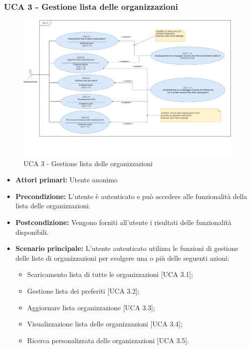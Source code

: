 \newpage

\subsubsection{UCA 3 - Gestione lista delle organizzazioni}%
\begin{figure}[h]
	\centering
	\includegraphics[scale=0.33]{sezioni/UseCase/Immagini/UCA3.png}
	\caption{UCA 3 - Gestione lista delle organizzazioni}
\end{figure}

\begin{itemize}
\item \textbf{Attori primari:} Utente anonimo
\item \textbf{Precondizione:} L'utente è autenticato e può accedere alle funzionalità della lista delle organizzazioni.
\item \textbf{Postcondizione:} Vengono forniti all'utente i risultati delle funzionalità disponibili.
\item \textbf{Scenario principale:} L'utente autenticato utilizza le funzioni di gestione delle liste di organizzazioni per svolgere una o più delle seguenti azioni:
	\begin{itemize}
		\item Scaricamento lista di tutte le organizzazioni [UCA 3.1];
		\item Gestione lista dei preferiti [UCA 3.2];
		\item Aggiornare lista organizzazione [UCA 3.3];
		\item Visualizzazione lista delle organizzazioni [UCA 3.4];
		\item Ricerca personalizzata delle organizzazioni [UCA 3.5].
	\end{itemize}
\end{itemize}



